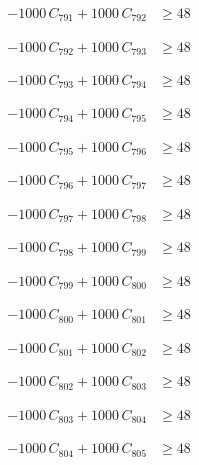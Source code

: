 \documentclass[a4paper,11pt]{article}
\begin{document}
\begin{align}
-1000\,C_{791} + 1000\,C_{792} &\geq 48 \nonumber
\end{align}

\begin{align}
-1000\,C_{792} + 1000\,C_{793} &\geq 48 \nonumber
\end{align}

\begin{align}
-1000\,C_{793} + 1000\,C_{794} &\geq 48 \nonumber
\end{align}

\begin{align}
-1000\,C_{794} + 1000\,C_{795} &\geq 48 \nonumber
\end{align}

\begin{align}
-1000\,C_{795} + 1000\,C_{796} &\geq 48 \nonumber
\end{align}

\begin{align}
-1000\,C_{796} + 1000\,C_{797} &\geq 48 \nonumber
\end{align}

\begin{align}
-1000\,C_{797} + 1000\,C_{798} &\geq 48 \nonumber
\end{align}

\begin{align}
-1000\,C_{798} + 1000\,C_{799} &\geq 48 \nonumber
\end{align}

\begin{align}
-1000\,C_{799} + 1000\,C_{800} &\geq 48 \nonumber
\end{align}

\begin{align}
-1000\,C_{800} + 1000\,C_{801} &\geq 48 \nonumber
\end{align}

\begin{align}
-1000\,C_{801} + 1000\,C_{802} &\geq 48 \nonumber
\end{align}

\begin{align}
-1000\,C_{802} + 1000\,C_{803} &\geq 48 \nonumber
\end{align}

\begin{align}
-1000\,C_{803} + 1000\,C_{804} &\geq 48 \nonumber
\end{align}

\begin{align}
-1000\,C_{804} + 1000\,C_{805} &\geq 48 \nonumber
\end{align}
\end{document}
